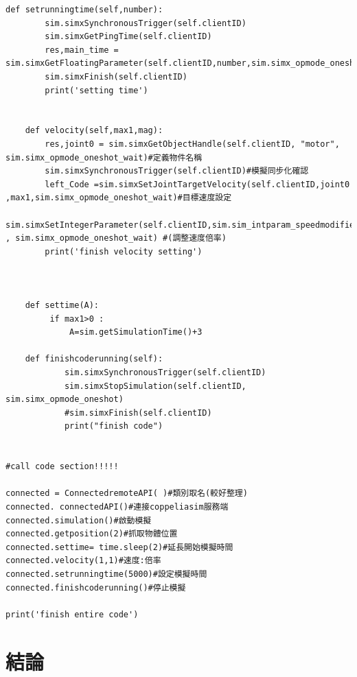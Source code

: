 \documentclass[14pt,a4paper]{report}  %
\newcommand{\fourteen}{\fontsize{14pt}{\baselineskip}\selectfont}%
\begin{document}
{{{{\begin{itemize}
\begin{lstlisting}[caption=遠端API程式架構]
    def setrunningtime(self,number):
        sim.simxSynchronousTrigger(self.clientID)
        sim.simxGetPingTime(self.clientID)
        res,main_time = sim.simxGetFloatingParameter(self.clientID,number,sim.simx_opmode_oneshot_wait)
        sim.simxFinish(self.clientID)
        print('setting time')
        
      
    def velocity(self,max1,mag):
        res,joint0 = sim.simxGetObjectHandle(self.clientID, "motor",  sim.simx_opmode_oneshot_wait)#定義物件名稱
        sim.simxSynchronousTrigger(self.clientID)#模擬同步化確認
        left_Code =sim.simxSetJointTargetVelocity(self.clientID,joint0 ,max1,sim.simx_opmode_oneshot_wait)#目標速度設定
        sim.simxSetIntegerParameter(self.clientID,sim.sim_intparam_speedmodifier,mag , sim.simx_opmode_oneshot_wait) #(調整速度倍率)
        print('finish velocity setting')
        
                 

    def settime(A):
         if max1>0 :
             A=sim.getSimulationTime()+3 

    def finishcoderunning(self): 
            sim.simxSynchronousTrigger(self.clientID)
            sim.simxStopSimulation(self.clientID, sim.simx_opmode_oneshot)
            #sim.simxFinish(self.clientID)
            print("finish code")
        
        
#call code section!!!!!

connected = ConnectedremoteAPI( )#類別取名(較好整理)
connected. connectedAPI()#連接coppeliasim服務端
connected.simulation()#啟動模擬
connected.getposition(2)#抓取物體位置
connected.settime= time.sleep(2)#延長開始模擬時間
connected.velocity(1,1)#速度:倍率
connected.setrunningtime(5000)#設定模擬時間
connected.finishcoderunning()#停止模擬

print('finish entire code')
		\end{lstlisting}
		\end{itemize}

    	
        \chapter{結論}
        {\begin{flushleft}
        \quad \quad \fourteen {對於科技的迅速進步，開源已成了當今趨勢，因此本專題所用的套件不僅能達到其他平面機構套件大部分所擁有的功能但又有公開原始碼的優勢因此在後續的發展應該會比相對封閉的套件更加快速。而在CAD當中常有許多相似專案但是每次繪製不同零件時又要從頭開始繪製的情形，此時若沒有一套程式流程將會產生高耗時的問題，因此在本專題中所建立的自動3D零件生成以及後續利用xml檔完成組立、碰撞設定、馬達轉軸輸出設定......再直接匯入至動態分析套件減少了很多我們在進行不同機構範例分析的時間。後續Pyslvs-UI若能有更多的機構類型或是做後續的CAE分析應該能有更完整的設計流程。}
        \end{flushleft}

}}}}}
\end{document}
